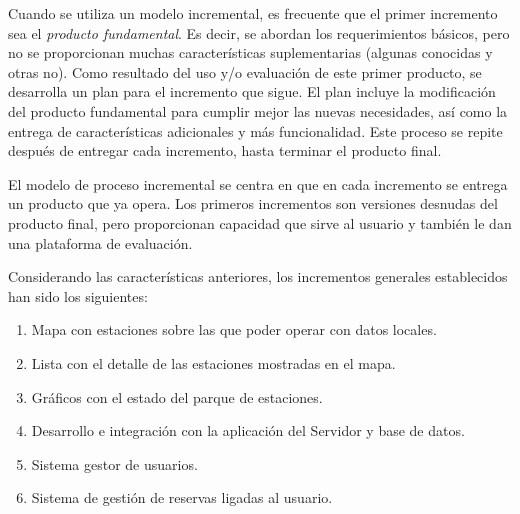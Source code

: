 Cuando se utiliza un modelo incremental, es frecuente que el primer incremento sea el \emph{producto fundamental}. Es decir, se abordan los requerimientos básicos, pero no se proporcionan muchas características suplementarias (algunas conocidas y otras no). Como resultado del uso y/o evaluación de este primer producto, se desarrolla un plan para el incremento que sigue. El plan incluye la modificación del producto fundamental para cumplir mejor las nuevas necesidades, así como la entrega de características adicionales y más funcionalidad. Este proceso se repite después de entregar cada incremento, hasta terminar el producto final.

El modelo de proceso incremental se centra en que en cada incremento se entrega un producto que ya opera. Los primeros incrementos son versiones desnudas del producto final, pero proporcionan capacidad que sirve al usuario y también le dan una plataforma de evaluación.

Considerando las características anteriores, los incrementos generales establecidos han sido los siguientes:

\begin{enumerate}  
	\item Mapa con estaciones sobre las que poder operar con datos locales.
	\item Lista con el detalle de las estaciones mostradas en el mapa.
	\item Gráficos con el estado del parque de estaciones.
	\item Desarrollo e integración con la aplicación del Servidor y base de datos.
	\item Sistema gestor de usuarios.
	\item Sistema de gestión de reservas ligadas al usuario.
\end{enumerate}

